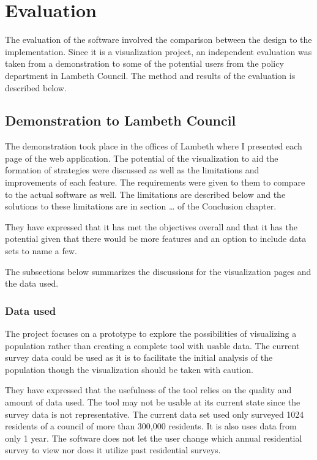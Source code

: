 \chapter{Evaluation} \label{ch:evaluation}

The evaluation of the software involved the comparison between the design to the implementation. Since it is a visualization project, an independent evaluation was taken from a demonstration to some of the potential users from the policy department in Lambeth Council. The method and results of the evaluation is described below.

\section{Demonstration to Lambeth Council}

The demonstration took place in the offices of Lambeth where I presented each page of the web application. The potential of the visualization to aid the formation of strategies were discussed as well as the limitations and improvements of each feature. The requirements were given to them to compare to the actual software as well. The limitations are described below and the solutions to these limitations are in section … of the Conclusion chapter.\par

They have expressed that it has met the objectives overall and that it has the potential given that there would be more features and an option to include data sets to name a few.

The subsections below summarizes the discussions for the visualization pages and the data used.

\subsection{Data used}
The project focuses on a prototype to explore the possibilities of visualizing a population rather than creating a complete tool with usable data. The current survey data could be used as it is to facilitate the initial analysis of the population though the visualization should be taken with caution. \par

They have expressed that the usefulness of the tool relies on the quality and amount of data used. The tool may not be usable at its current state since the survey data is not representative. The current data set used only surveyed 1024 residents of a council of more than 300,000 residents. It is also uses data from only 1 year. The software does not let the user change which annual residential survey to view nor does it utilize past residential surveys.

